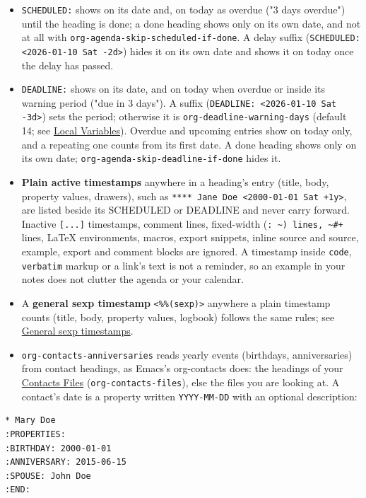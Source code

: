 \documentclass[11pt]{article}
\begin{document}
\begin{itemize}
\item \texttt{SCHEDULED:} shows on its date and, on today as overdue ("3 days overdue") until the heading is done; a done heading shows only on its own date, and not at all with \texttt{org-agenda-skip-scheduled-if-done}. A delay suffix (\texttt{SCHEDULED: <2026-01-10 Sat -2d>}) hides it on its own date and shows it on today once the delay has passed.
\item \texttt{DEADLINE:} shows on its date, and on today when overdue or inside its warning period ("due in 3 days"). A suffix (\texttt{DEADLINE: <2026-01-10 Sat -3d>}) sets the period; otherwise it is \texttt{org-deadline-warning-days} (default 14; see \hyperref[sec:org761a631]{Local Variables}). Overdue and upcoming entries show on today only, and a repeating one counts from its first date. A done heading shows only on its own date; \texttt{org-agenda-skip-deadline-if-done} hides it.
\item \textbf{Plain active timestamps} anywhere in a heading's entry (title, body, property values, drawers), such as \texttt{**** Jane Doe <2000-01-01 Sat +1y>}, are listed beside its SCHEDULED or DEADLINE and never carry forward. Inactive \texttt{[...]} timestamps, comment lines, fixed-width (\texttt{: \textasciitilde{}) lines, \textasciitilde{}\#+} lines, \LaTeX{} environments, macros, export snippets, inline source and source, example, export and comment blocks are ignored. A timestamp inside \texttt{code}, \texttt{verbatim} markup or a link's text is not a reminder, so an example in your notes does not clutter the agenda or your calendar.
\item A \textbf{general sexp timestamp} \texttt{<\%\%(sexp)>} anywhere a plain timestamp counts (title, body, property values, logbook) follows the same rules; see \hyperref[sec:orgfd4eb7b]{General sexp timestamps}.
\item \texttt{org-contacts-anniversaries} reads yearly events (birthdays, anniversaries) from contact headings, as Emacs's org-contacts does: the headings of your \hyperref[sec:orgba3cd98]{Contacts Files} (\texttt{org-contacts-files}), else the files you are looking at. A contact's date is a property written \texttt{YYYY-MM-DD} with an optional description:
\end{itemize}

\begin{verbatim}
* Mary Doe
:PROPERTIES:
:BIRTHDAY: 2000-01-01
:ANNIVERSARY: 2015-06-15
:SPOUSE: John Doe
:END:
\end{verbatim}
\end{document}
